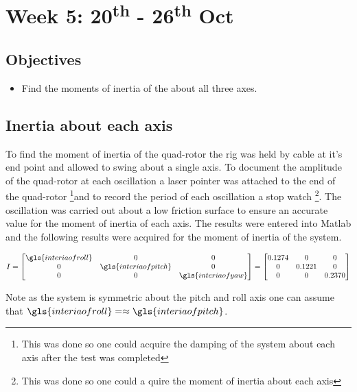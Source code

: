 \chapter{Week 5: 20\textsuperscript{th}  - 26\textsuperscript{th} Oct}


 \tocless\section{Objectives}
\begin{itemize}
	\item Find the moments of inertia of the about all three axes.
\end{itemize}

 \tocless\section{Inertia about each axis}
To find the moment of inertia of the quad-rotor the rig was held by cable  at it's end point and allowed to swing about a single axis. To document the amplitude of the quad-rotor at each oscillation a laser pointer was attached to the end of the quad-rotor \footnote{This was done so one could acquire the damping of the system about each axis after the test was completed}and to record the period of each oscillation a stop watch \footnote{This was done so one could a quire the moment of inertia about each axis}. The oscillation was carried out about a low friction surface to ensure an accurate value for the moment of inertia of each axis. The results were entered into Matlab and the following results were acquired for the moment of inertia of the system.


\begin{align}
I =  
\begin{bmatrix}
\gls{interiaofroll}  & 0 & 0 \\ 0& \gls{interiaofpitch} & 0 \\0& 0& \gls{interiaofyaw}
\end{bmatrix}
=
\begin{bmatrix}
0.1274 & 0 & 0 \\ 0& 0.1221& 0 \\0& 0& 0.2370
\end{bmatrix}
\label{eq: moment of interia of the system}
\end{align} 



Note as the system is symmetric about the pitch and roll axis one can assume that $\gls{interiaofroll}   =\approx \gls{interiaofpitch}$.

